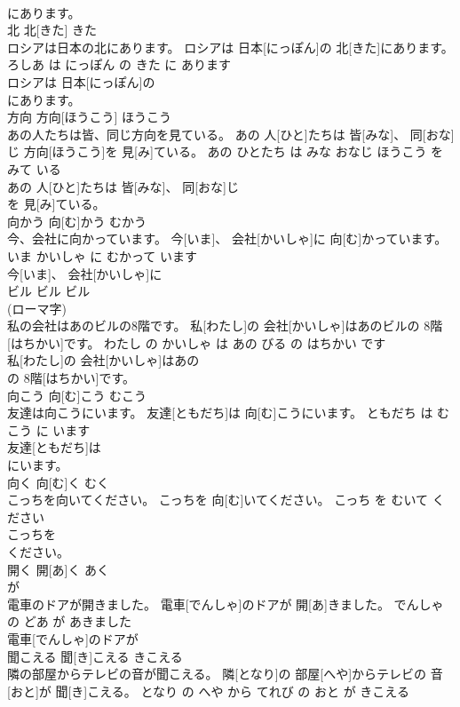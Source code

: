 \documentclass[8pt]{extreport}
\begin{document}
\begin{CJK}{UTF8}{min}
\\	にあります。		
\\	北	北[きた]	きた	
\\	ロシアは日本の北にあります。	ロシアは 日本[にっぽん]の 北[きた]にあります。	ろしあ は にっぽん の きた に あります	
\\	ロシアは 日本[にっぽん]の
\\	にあります。		
\\	方向	方向[ほうこう]	ほうこう	
\\	あの人たちは皆、同じ方向を見ている。	あの 人[ひと]たちは 皆[みな]、 同[おな]じ 方向[ほうこう]を 見[み]ている。	あの ひとたち は みな おなじ ほうこう を みて いる	
\\	あの 人[ひと]たちは 皆[みな]、 同[おな]じ
\\	を 見[み]ている。		
\\	向かう	向[む]かう	むかう	
\\	今、会社に向かっています。	今[いま]、 会社[かいしゃ]に 向[む]かっています。	いま かいしゃ に むかって います	
\\	今[いま]、 会社[かいしゃ]に
\\	ビル	ビル	ビル	
\\	(ローマ字)		
\\	私の会社はあのビルの8階です。	私[わたし]の 会社[かいしゃ]はあのビルの 8階[はちかい]です。	わたし の かいしゃ は あの びる の はちかい です	
\\	私[わたし]の 会社[かいしゃ]はあの
\\	の 8階[はちかい]です。		
\\	向こう	向[む]こう	むこう	
\\	友達は向こうにいます。	友達[ともだち]は 向[む]こうにいます。	ともだち は むこう に います	
\\	友達[ともだち]は
\\	にいます。		
\\	向く	向[む]く	むく	
\\	こっちを向いてください。	こっちを 向[む]いてください。	こっち を むいて ください	
\\	こっちを
\\	ください。		
\\	開く	開[あ]く	あく	
\\	が		
\\	電車のドアが開きました。	電車[でんしゃ]のドアが 開[あ]きました。	でんしゃ の どあ が あきました	
\\	電車[でんしゃ]のドアが
\\	聞こえる	聞[き]こえる	きこえる	
\\	隣の部屋からテレビの音が聞こえる。	隣[となり]の 部屋[へや]からテレビの 音[おと]が 聞[き]こえる。	となり の へや から てれび の おと が きこえる	

\end{CJK}
\end{document}
